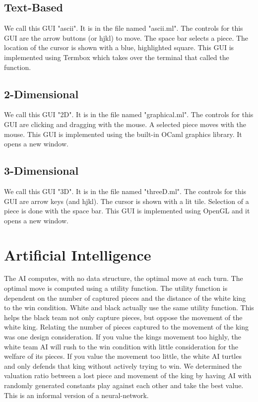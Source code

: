 \documentclass[11pt, oneside]{article}
\begin{document}
\begin{enumerate}
\subsection{Text-Based}
We call this GUI "ascii".  It is in the file named "ascii.ml".  The controls for this GUI are the arrow buttons (or hjkl) to move.  The space bar selects a piece.  The location of the cursor is shown with a blue, highlighted square.  This GUI is implemented using Termbox which takes over the terminal that called the function.

\subsection{2-Dimensional}
We call this GUI "2D".  It is in the file named "graphical.ml".  The controls for this GUI are clicking and dragging with the mouse.  A selected piece moves with the mouse.  This GUI is implemented using the built-in OCaml graphics library.  It opens a new window.

\subsection{3-Dimensional}
We call this GUI "3D". It is in the file named "threeD.ml".  The controls for this GUI are arrow keys (and hjkl).  The cursor is shown with a lit tile.  Selection of a piece is done with the space bar.  This GUI is implemented using OpenGL and it opens a new window.

\section{Artificial Intelligence}
The AI computes, with no data structure, the optimal move at each turn.  The optimal move is computed using a utility function.  The utility function is dependent on the number of captured pieces and the distance of the white king to the win condition.  White and black actually use the same utility function.  This helps the black team not only capture pieces, but oppose the movement of the white king.  Relating the number of pieces captured to the movement of the king was one design consideration.  If you value the kings movement too highly, the white team AI will rush to the win condition with little consideration for the welfare of its pieces.  If you value the movement too little, the white AI turtles and only defends that king without actively trying to win.  We determined the valuation ratio between a lost piece and movement of the king by having AI with randomly generated constants play against each other and take the best value.  This is an informal version of a neural-network.


\end{enumerate}
\end{document}
